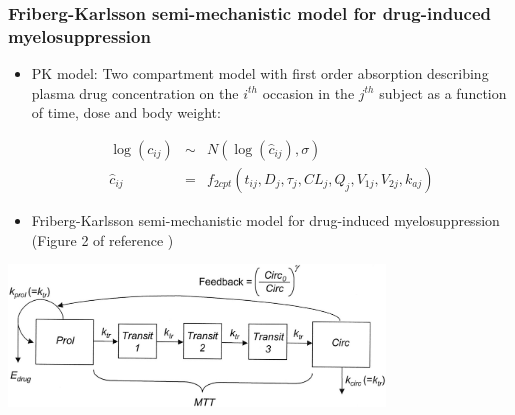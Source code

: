 \documentclass[handout]{beamer}
\begin{document}
\begin{frame}
  \frametitle{Friberg-Karlsson semi-mechanistic model for
drug-induced myelosuppression}

  \begin{itemize}
\item PK model: Two compartment model with first order absorption describing
  plasma drug concentration on the $i^{th}$ occasion in the $j^{th}$
  subject as a function of time, dose and body weight:
  \begin{scriptsize}
    \begin{eqnarray*}
      \log\left(c_{ij}\right) &\sim& N\left(\log\left(\hat{c}_{ij}\right),\sigma\right) \\
      \hat{c}_{ij} &=&
                       f_{2cpt}\left(t_{ij},D_j,\tau_j,CL_j,Q_j,V_{1j},V_{2j},k_{aj}\right) 
    \end{eqnarray*}
  \end{scriptsize}
  \item Friberg-Karlsson semi-mechanistic model for
drug-induced myelosuppression \cite{Friberg2002-tt,Friberg2003-ki,Latz2006-dk,Troconiz2006-nq,Kathman2007-ne}
(Figure 2 of reference \cite{Friberg2002-tt})
  \end{itemize}
\vspace{-6pt}
\begin{center}
\includegraphics[width=0.75\textwidth]{graphics/neutrophilModel.jpg}
\end{center}

\end{frame}
\end{document}
